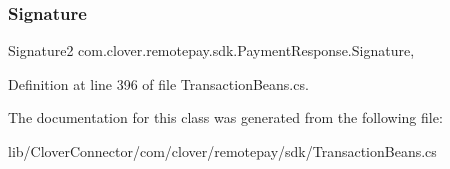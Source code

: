 \subsubsection{\texorpdfstring{Signature}{Signature}}
{\footnotesize\ttfamily Signature2 com.\+clover.\+remotepay.\+sdk.\+Payment\+Response.\+Signature\hspace{0.3cm}{\ttfamily [get]}, {\ttfamily [set]}}



Definition at line 396 of file Transaction\+Beans.\+cs.



The documentation for this class was generated from the following file\+:\begin{DoxyCompactItemize}
\item 
lib/\+Clover\+Connector/com/clover/remotepay/sdk/Transaction\+Beans.\+cs\end{DoxyCompactItemize}
